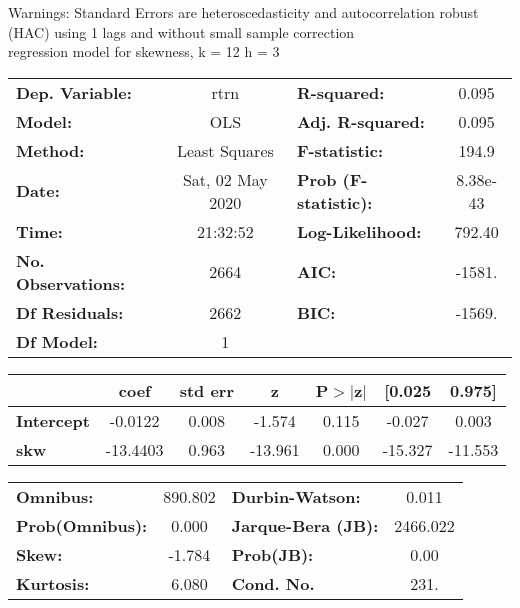 Warnings: \newline
 [1] Standard Errors are heteroscedasticity and autocorrelation robust (HAC) using 1 lags and without small sample correction\\ 

regression model for skewness, k = 12 h = 3\begin{center}
\begin{tabular}{lclc}
\toprule
\textbf{Dep. Variable:}    &       rtrn       & \textbf{  R-squared:         } &     0.095   \\
\textbf{Model:}            &       OLS        & \textbf{  Adj. R-squared:    } &     0.095   \\
\textbf{Method:}           &  Least Squares   & \textbf{  F-statistic:       } &     194.9   \\
\textbf{Date:}             & Sat, 02 May 2020 & \textbf{  Prob (F-statistic):} &  8.38e-43   \\
\textbf{Time:}             &     21:32:52     & \textbf{  Log-Likelihood:    } &    792.40   \\
\textbf{No. Observations:} &        2664      & \textbf{  AIC:               } &    -1581.   \\
\textbf{Df Residuals:}     &        2662      & \textbf{  BIC:               } &    -1569.   \\
\textbf{Df Model:}         &           1      & \textbf{                     } &             \\
\bottomrule
\end{tabular}
\begin{tabular}{lcccccc}
                   & \textbf{coef} & \textbf{std err} & \textbf{z} & \textbf{P$> |$z$|$} & \textbf{[0.025} & \textbf{0.975]}  \\
\midrule
\textbf{Intercept} &      -0.0122  &        0.008     &    -1.574  &         0.115        &       -0.027    &        0.003     \\
\textbf{skw}       &     -13.4403  &        0.963     &   -13.961  &         0.000        &      -15.327    &      -11.553     \\
\bottomrule
\end{tabular}
\begin{tabular}{lclc}
\textbf{Omnibus:}       & 890.802 & \textbf{  Durbin-Watson:     } &    0.011  \\
\textbf{Prob(Omnibus):} &   0.000 & \textbf{  Jarque-Bera (JB):  } & 2466.022  \\
\textbf{Skew:}          &  -1.784 & \textbf{  Prob(JB):          } &     0.00  \\
\textbf{Kurtosis:}      &   6.080 & \textbf{  Cond. No.          } &     231.  \\
\bottomrule
\end{tabular}
\end{center}


